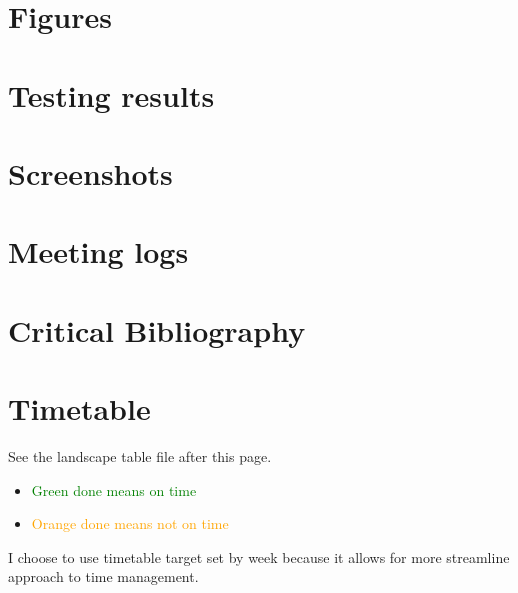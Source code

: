 \documentclass[]{report}
\begin{document}
\printbibliography[heading=bibintoc, title={Bibliography}]

\appendix
% 
\chapter{Figures}


\chapter{Testing results}

\chapter{Screenshots}

\chapter{Meeting logs}


\chapter{Critical Bibliography}

\chapter{Timetable}
See the landscape table file after this page.
\begin{itemize}
    \item \textcolor{Green}{Green done means on time}
    \item \textcolor{Orange}{Orange done means not on time}
\end{itemize}
I choose to use timetable target set by week because it allows for more streamline approach to time management.

\end{document}
